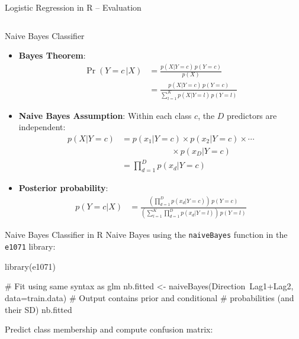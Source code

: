 \documentclass[ignorenonframetext,xcolor=x11names]{beamer}
\begin{document}
\begin{frame}[fragile]{Logistic Regression in R -- Evaluation}
\begin{columns}
\begin{column}{.4\textwidth}
\end{column}
\end{columns}
\end{frame}


\begin{frame}{Naive Bayes Classifier}
\small \vspace{-3mm}
\begin{itemize}
\item \textbf{Bayes Theorem}:
\begin{align*}
\Pr(Y=c\, | X) &= \frac{p(X|Y=c)\, p(Y=c)}{p(X)} \\
&= \frac{p(X|Y=c)\,p(Y=c) }{\sum_{l=1}^K p(X|Y=l)\,p(Y=l)} 
\end{align*}
\item \textbf{Naive Bayes Assumption}: Within each class $c$, the $D$ predictors are independent:
\begin{align*}
p(X | Y=c ) &= p(x_1 | Y=c) \times p(x_2 | Y=c) \times \cdots  \\ 
& \qquad \qquad \qquad \times p(x_D | Y=c) \\
            &= \prod_{d=1}^D p(x_d | Y=c)
\end{align*}
\item \textbf{Posterior probability}:
\begin{align*}
p(Y=c|X) &= \frac{\left(\prod_{d=1}^D p(x_d | Y=c)\right) \, p(Y=c)}{\left(\sum_{l=1}^K \prod_{d=1}^D p(x_d | Y=l)\right) \, p(Y=l) } 
\end{align*}
\end{itemize}
\end{frame}


\begin{frame}[fragile]{Naive Bayes Classifier in R}
\small
Naive Bayes using the \texttt{naiveBayes} function in the \texttt{e1071} library:
\begin{Rcode}
library(e1071)

# Fit using same syntax as glm
nb.fitted <- 
    naiveBayes(Direction~Lag1+Lag2, data=train.data)
# Output contains prior and conditional 
# probabilities (and their SD)
nb.fitted
\end{Rcode}
Predict class membership and compute confusion matrix:
\end{frame}
\end{document}
